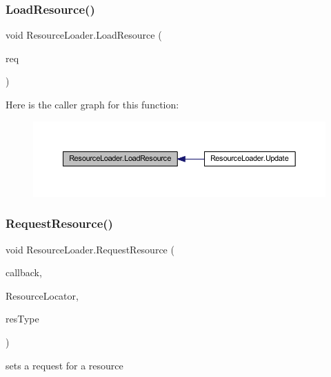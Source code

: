\subsubsection{\texorpdfstring{Load\+Resource()}{LoadResource()}}
{\footnotesize\ttfamily void Resource\+Loader.\+Load\+Resource (\begin{DoxyParamCaption}\item[{\mbox{\hyperlink{struct_resource_loader_1_1_request}{Request}}}]{req }\end{DoxyParamCaption})\hspace{0.3cm}{\ttfamily [private]}}

Here is the caller graph for this function\+:
\nopagebreak
\begin{figure}[H]
\begin{center}
\leavevmode
\includegraphics[width=350pt]{class_resource_loader_a088ef33ee82be6e64028b6b5512fad5d_icgraph}
\end{center}
\end{figure}
\mbox{\label{class_resource_loader_a901b6c5f5391cb35d69d0917ea4a2b5a}} 
\subsubsection{\texorpdfstring{Request\+Resource()}{RequestResource()}}
{\footnotesize\ttfamily void Resource\+Loader.\+Request\+Resource (\begin{DoxyParamCaption}\item[{Action$<$ \mbox{\hyperlink{struct_resource_loader_1_1_request_result}{Request\+Result}} $>$}]{callback,  }\item[{string}]{Resource\+Locator,  }\item[{string}]{res\+Type }\end{DoxyParamCaption})}



sets a request for a resource 

\mbox{\label{class_resource_loader_ae0f219fead6e05415dc2523529d81561}} 
